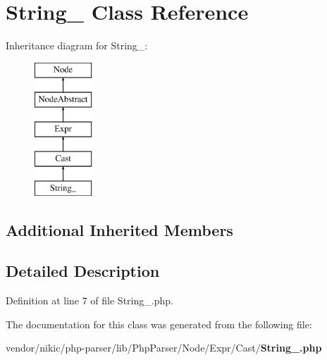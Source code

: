\section{String\+\_\+ Class Reference}
\label{class_php_parser_1_1_node_1_1_expr_1_1_cast_1_1_string__}
Inheritance diagram for String\+\_\+\+:\begin{figure}[H]
\begin{center}
\leavevmode
\includegraphics[height=5.000000cm]{class_php_parser_1_1_node_1_1_expr_1_1_cast_1_1_string__}
\end{center}
\end{figure}
\subsection*{Additional Inherited Members}


\subsection{Detailed Description}


Definition at line 7 of file String\+\_\+.\+php.



The documentation for this class was generated from the following file\+:\begin{DoxyCompactItemize}
\item 
vendor/nikic/php-\/parser/lib/\+Php\+Parser/\+Node/\+Expr/\+Cast/{\bf String\+\_\+.\+php}\end{DoxyCompactItemize}
